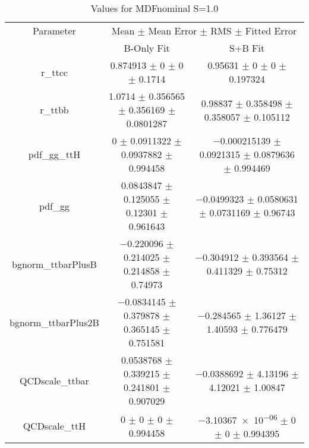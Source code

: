 \begin{table}
\centering
\caption{Values for MDFnominal S=1.0}
\begin{tabular}{ccc}
\toprule
Parameter & \multicolumn{2}{c}{Mean $\pm$ Mean Error $\pm$ RMS $\pm$ Fitted Error}\\
 & B-Only Fit & S+B Fit\\
\midrule
r\_ttcc & \num{0.874913} $\pm$ \num{0} $\pm$ \num{0} $\pm$ \num{0.1714} & \num{0.95631} $\pm$ \num{0} $\pm$ \num{0} $\pm$ \num{0.197324}\\
r\_ttbb & \num{1.0714} $\pm$ \num{0.356565} $\pm$ \num{0.356169} $\pm$ \num{0.0801287} & \num{0.98837} $\pm$ \num{0.358498} $\pm$ \num{0.358057} $\pm$ \num{0.105112}\\
pdf\_gg\_ttH & \num{0} $\pm$ \num{0.0911322} $\pm$ \num{0.0937882} $\pm$ \num{0.994458} & \num{-0.000215139} $\pm$ \num{0.0921315} $\pm$ \num{0.0879636} $\pm$ \num{0.994469}\\
pdf\_gg & \num{0.0843847} $\pm$ \num{0.125055} $\pm$ \num{0.12301} $\pm$ \num{0.961643} & \num{-0.0499323} $\pm$ \num{0.0580631} $\pm$ \num{0.0731169} $\pm$ \num{0.96743}\\
bgnorm\_ttbarPlusB & \num{-0.220096} $\pm$ \num{0.214025} $\pm$ \num{0.214858} $\pm$ \num{0.74973} & \num{-0.304912} $\pm$ \num{0.393564} $\pm$ \num{0.411329} $\pm$ \num{0.75312}\\
bgnorm\_ttbarPlus2B & \num{-0.0834145} $\pm$ \num{0.379878} $\pm$ \num{0.365145} $\pm$ \num{0.751581} & \num{-0.284565} $\pm$ \num{1.36127} $\pm$ \num{1.40593} $\pm$ \num{0.776479}\\
QCDscale\_ttbar & \num{0.0538768} $\pm$ \num{0.339215} $\pm$ \num{0.241801} $\pm$ \num{0.907029} & \num{-0.0388692} $\pm$ \num{4.13196} $\pm$ \num{4.12021} $\pm$ \num{1.00847}\\
QCDscale\_ttH & \num{0} $\pm$ \num{0} $\pm$ \num{0} $\pm$ \num{0.994458} & \num{-3.10367e-06} $\pm$ \num{0} $\pm$ \num{0} $\pm$ \num{0.994395}\\
\bottomrule
\end{tabular}
\end{table}